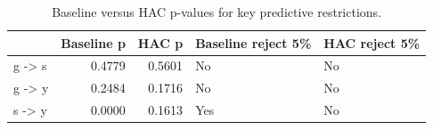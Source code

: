 \begin{table}[H]
\centering
\caption{Baseline versus HAC p-values for key predictive restrictions.}
\label{tab:caus_compact}
\begin{tabular}{lrrll}
\toprule
 & Baseline p & HAC p & Baseline reject 5\% & HAC reject 5\% \\
\midrule
g -> s & 0.4779 & 0.5601 & No & No \\
g -> y & 0.2484 & 0.1716 & No & No \\
s -> y & 0.0000 & 0.1613 & Yes & No \\
\bottomrule
\end{tabular}
\end{table}